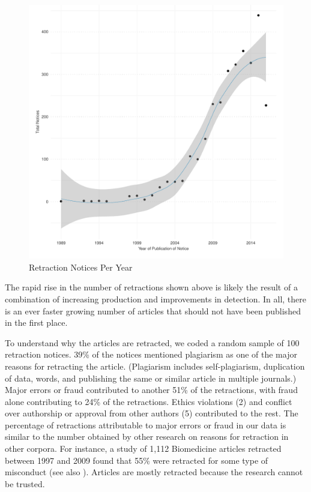 \documentclass[12pt, letterpaper]{article}
\begin{document}
\begin{figure}[H]
\centering
\includegraphics[scale=.7]{../figs/n_retraction_notices_by_year.pdf}
\caption{Retraction Notices Per Year}
\label{fig:n_retraction_notices_per_year}
\end{figure}

The rapid rise in the number of retractions shown above is likely the result of a combination of increasing production and improvements in detection. In all, there is an ever faster growing number of articles that should not have been published in the first place.

To understand why the articles are retracted, we coded a random sample of 100 retraction notices. 39\% of the notices mentioned plagiarism as one of the major reasons for retracting the article. (Plagiarism includes self-plagiarism, duplication of data, words, and publishing the same or similar article in multiple journals.) Major errors or fraud contributed to another 51\% of the retractions, with fraud alone contributing to 24\% of the retractions. Ethics violations (2) and conflict over authorship or approval from other authors (5) contributed to the rest. The percentage of retractions attributable to major errors or fraud in our data is similar to the number obtained by other research on reasons for retraction in other corpora. For instance, a study of 1,112 Biomedicine articles retracted between 1997 and 2009 found that 55\% were retracted for some type of misconduct \citep{budd2011retracted} (see also \citet{steen2011retractions}). Articles are mostly retracted because the research cannot be trusted.
\end{document}
